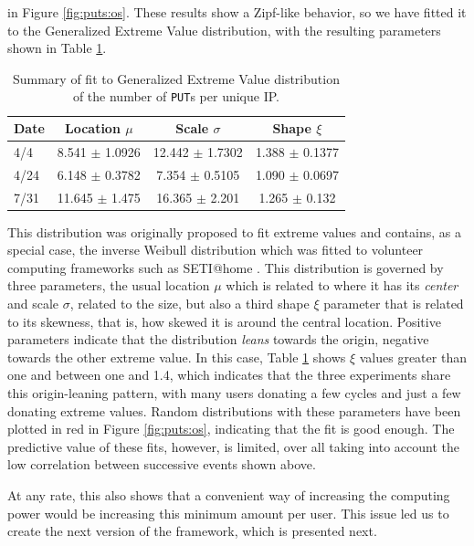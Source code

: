 \documentclass[journal,onecolumn]{IEEEtran}
\begin{document}
in Figure \ref{fig:puts:os}. These results show a Zipf-like behavior,
so we have fitted it to the Generalized Extreme Value distribution,
with the resulting parameters shown in Table \ref{tab:puts:os}.
%
\begin{table}
\caption{Summary of fit to Generalized Extreme Value distribution of
  the number of {\tt PUT}s per unique IP. \label{tab:puts:os}}
\begin{center}
\begin{tabular}{l|ccc}
\hline
Date  & Location $\mu$ & Scale $\sigma$ & Shape $\xi$ \\
\hline
4/4 &  8.541 $\pm$ 1.0926  &    12.442 $\pm$ 1.7302 &  1.388 $\pm$
0.1377 \\
4/24 & 6.148 $\pm$ 0.3782 & 7.354 $\pm$ 0.5105 & 1.090 $\pm$  0.0697  \\
7/31 & 11.645 $\pm$ 1.475 & 16.365 $\pm$ 2.201 &  1.265 $\pm$ 0.132   \\
\hline
\end{tabular}
\end{center}
\end{table}
%
This distribution was originally proposed to fit extreme values
\cite{resnick2013extreme} and contains, as a special case, the inverse
Weibull distribution which was fitted to volunteer computing
frameworks such as SETI@home \cite{javadi2009mining}. This
distribution is governed by three parameters, the usual location $\mu$
which is related to where it has its {\em center} and scale $\sigma$,
related to the size, but also a third shape $\xi$ parameter that is
related to its skewness, that is, how skewed it is around the central
location. Positive parameters indicate that the distribution {\em
  leans} towards the origin, negative towards the other extreme
value. In this case, Table \ref{tab:puts:os} shows $\xi$ values
greater than one and between one and 1.4, which indicates that the
three experiments share this origin-leaning pattern, with many users
donating a few cycles and just a few donating extreme values. Random
distributions with these parameters have been plotted in red in
Figure \ref{fig:puts:os}, indicating that the fit is good enough. The
predictive value of these fits, however, is limited, over all taking
into account the low correlation between successive events shown
above.

At any rate, this also shows that a convenient way of increasing the
computing power would be increasing this minimum amount per user. This
issue led us to create the next version of the framework, which is
presented next. 
\end{document}
